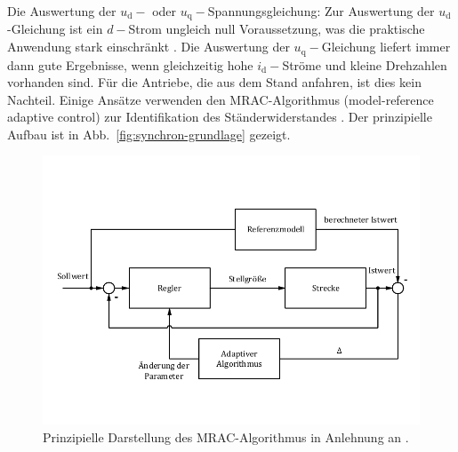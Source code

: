 \documentclass[conference,twocolumn]{IEEEtran}
\newcommand{\x}[1]{\mathrm{#1}}
\begin{document}
Die Auswertung der $u_\x{d}-$ oder $u_\x{q}-$Spannungsgleichung: Zur Auswertung der $u_\x{d}$-Gleichung ist ein $d-$Strom ungleich null Voraussetzung, was die praktische Anwendung stark einschränkt \autocite{Kellner2012}.
Die Auswertung der $u_\x{q}-$Gleichung liefert immer dann gute Ergebnisse, wenn gleichzeitig hohe $i_\x{d}-$Ströme und kleine Drehzahlen vorhanden sind.
Für die Antriebe, die aus dem Stand anfahren, ist dies kein Nachteil.
Einige Ansätze verwenden den MRAC-Algorithmus (model-reference adaptive control) zur Identifikation des Ständerwiderstandes \autocite{slotine_applied_1991}.
Der prinzipielle Aufbau ist in Abb.~\ref{fig:synchron-grundlage} gezeigt.

\begin{figure}[h!]
\centering
\includegraphics[width=\columnwidth]{img/mrac}
\caption{Prinzipielle Darstellung des MRAC-Algorithmus in Anlehnung an \textcite{slotine_applied_1991}.}
\label{fig:mrac}
\end{figure}
\end{document}
